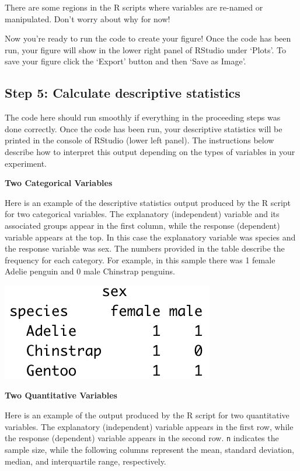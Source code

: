 \documentclass[
]{book}
\begin{document}
There are some regions in the R scripts where variables are re-named or manipulated. Don't worry about why for now!

Now you're ready to run the code to create your figure! Once the code has been run, your figure will show in the lower right panel of RStudio under `Plots'. To save your figure click the `Export' button and then `Save as Image'.

\hypertarget{step-5-calculate-descriptive-statistics}{%
\subsection*{Step 5: Calculate descriptive statistics}\label{step-5-calculate-descriptive-statistics}}

The code here should run smoothly if everything in the proceeding steps was done correctly. Once the code has been run, your descriptive statistics will be printed in the console of RStudio (lower left panel). The instructions below describe how to interpret this output depending on the types of variables in your experiment.

\textbf{Two Categorical Variables}

Here is an example of the descriptive statistics output produced by the R script for two categorical variables. The explanatory (independent) variable and its associated groups appear in the first column, while the response (dependent) variable appears at the top. In this case the explanatory variable was species and the response variable was sex. The numbers provided in the table describe the frequency for each category. For example, in this sample there was 1 female Adelie penguin and 0 male Chinstrap penguins.

\includegraphics{images/categorical-categorical_stats_example.png}

\textbf{Two Quantitative Variables}

Here is an example of the output produced by the R script for two quantitative variables. The explanatory (independent) variable appears in the first row, while the response (dependent) variable appears in the second row. \texttt{n} indicates the sample size, while the following columns represent the mean, standard deviation, median, and interquartile range, respectively.
\end{document}
